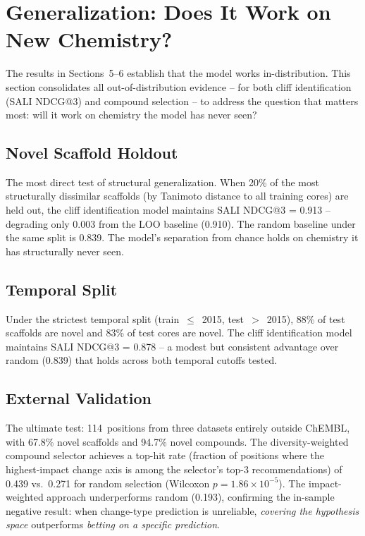\documentclass[sigconf, nonacm]{acmart}
\begin{document}
\section{Generalization: Does It Work on New Chemistry?}

The results in Sections~5--6 establish that the model works in-distribution. This section consolidates all out-of-distribution evidence -- for both cliff identification (SALI NDCG@3) and compound selection -- to address the question that matters most: will it work on chemistry the model has never seen?

\subsection{Novel Scaffold Holdout}

The most direct test of structural generalization. When 20\% of the most structurally dissimilar scaffolds (by Tanimoto distance to all training cores) are held out, the cliff identification model maintains SALI NDCG@3 = 0.913 -- degrading only 0.003 from the LOO baseline (0.910). The random baseline under the same split is 0.839. The model's separation from chance holds on chemistry it has structurally never seen.

\subsection{Temporal Split}

Under the strictest temporal split (train~$\leq$~2015, test~$>$~2015), 88\% of test scaffolds are novel and 83\% of test cores are novel. The cliff identification model maintains SALI NDCG@3 = 0.878 -- a modest but consistent advantage over random (0.839) that holds across both temporal cutoffs tested.

\subsection{External Validation}

The ultimate test: 114~positions from three datasets entirely outside ChEMBL, with 67.8\% novel scaffolds and 94.7\% novel compounds. The diversity-weighted compound selector achieves a top-hit rate (fraction of positions where the highest-impact change axis is among the selector's top-3 recommendations) of 0.439 vs.\ 0.271 for random selection (Wilcoxon $p = 1.86 \times 10^{-5}$). The impact-weighted approach underperforms random (0.193), confirming the in-sample negative result: when change-type prediction is unreliable, \textit{covering the hypothesis space} outperforms \textit{betting on a specific prediction}.
\end{document}

